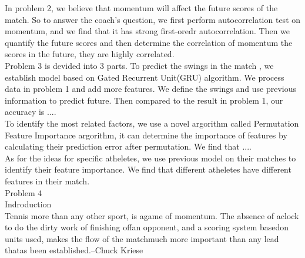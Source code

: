 \documentclass[12pt, a4paper, oneside]{article}
\theoremstyle{break}
\begin{document}
In problem 2, we believe that momentum will affect the future scores of the match. So to answer the coach's question, 
we first perform autocorrelation test on momentum, and we find that it has strong first-oredr autocorrelation. Then we quantify 
the future scores and then determine the correlation of momentum the scores in the future, they are highly correlated.\\

Problem 3 is devided into 3 parts. To predict the swings in the match , we establish model based on Gated Recurrent Unit(GRU) algorithm.
We process data in problem 1 and add more features. We define the swings and use previous information to predict future.
Then compared to the result in problem 1, our accuracy is ....\\

To identify the most related factors, we use a novel argorithm called Permutation Feature Importance argorithm, 
it can determine the importance of features by calculating their prediction error after permutation. We find that ....\\

As for the ideas for specific atheletes, we use previous model on their matches to identify their feature importance.
We find that different atheletes have different features in their match.\\

Problem 4\\

Indroduction\\
 Tennis more than any other sport, is agame of momentum. 
 The absence of aclock to do the dirty work of finishing offan opponent, 
 and a scoring system basedon units used, makes the flow of the matchmuch more important than any 
 lead thatas been established.--Chuck Kriese
\end{document}
